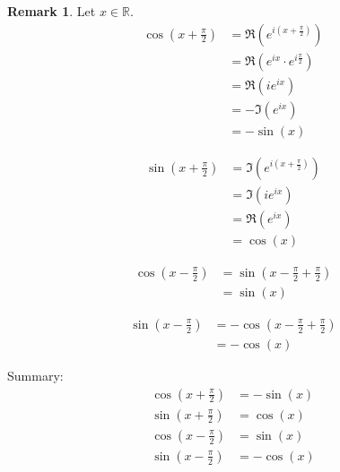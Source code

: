 \documentclass[a4paper,landscape,twocolumn]{article}
\theoremstyle{definition}
\newtheorem{rem}{Remark}
\begin{document}
\begin{rem}
  Let $x \in \mathbb R$.
  \begin{align*}
    \cos\left(x + \frac\pi2\right)
      &= \Re(e^{i(x + \frac\pi2)}) \\
      &= \Re(e^{ix} \cdot e^{i\frac\pi2}) \\
      &= \Re(i e^{ix}) \\
      &= -\Im(e^{ix}) \\
      &= -\sin(x)
  \end{align*}

  \begin{align*}
    \sin\left(x + \frac\pi2\right)
      &= \Im\left(e^{i(x + \frac\pi2)}\right) \\
      &= \Im(ie^{ix}) \\
      &= \Re(e^{ix}) \\
      &= \cos(x)
  \end{align*}

  \begin{align*}
    \cos\left(x - \frac\pi2\right)
      &= \sin\left(x - \frac\pi2 + \frac\pi2\right) \\
      &= \sin(x)
  \end{align*}

  \begin{align*}
    \sin\left(x - \frac\pi2\right)
      &= -\cos\left(x - \frac\pi2 + \frac\pi2\right) \\
      &= -\cos(x)
  \end{align*}

  Summary:
  \begin{align*}
    \cos\left(x + \frac\pi2\right) &= -\sin(x) \\
    \sin\left(x + \frac\pi2\right) &= \cos(x) \\
    \cos\left(x - \frac\pi2\right) &= \sin(x) \\
    \sin\left(x - \frac\pi2\right) &= -\cos(x)
  \end{align*}
\end{rem}
\end{document}

